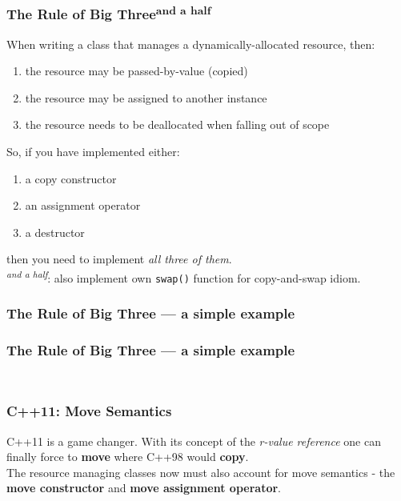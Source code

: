 \documentclass[aspectratio=169]{beamer}
\newcommand{\greenemph}[1]{\textit{\textcolor{clGreen}{#1}}}
\begin{document}
\begin{frame}
\frametitle{The Rule of Big Three\textsuperscript{and a half}}
When writing a class that manages a dynamically-allocated resource, then:
\begin{enumerate}
\item{the resource may be passed-by-value (copied)}
\item{the resource may be assigned to another instance}
\item{the resource needs to be deallocated when falling out of scope}
\end{enumerate}
\vspace{0.1cm}
So, if you have implemented either:
\begin{enumerate}
\item{a copy constructor}
\item{an assignment operator}
\item{a destructor}
\end{enumerate}
then you need to implement \greenemph{all three of them}.\\
\vspace{0.5cm}
\greenemph{\textsuperscript{and a half}}: also implement own \texttt{swap()} function for copy-and-swap idiom.
\end{frame}

\begin{frame}
\frametitle{The Rule of Big Three --- a simple example}
{\fontsize{8}{6} }

\end{frame}

\begin{frame}
\frametitle{The Rule of Big Three --- a simple example}
\begin{columns}
  \begin{column}{0.45\textwidth}
    {\fontsize{4}{4} }
  \end{column}
  \begin{column}{0.55\textwidth}
    {\fontsize{4}{4} }
  \end{column}
\end{columns}
\end{frame}

\begin{frame}
\frametitle{C++11: Move Semantics}
C++11 is a game changer. With its concept of the \textit{r-value reference} one can finally force to \textbf{move} where C++98 would \textbf{copy}.
\\
\vspace{1cm}
The resource managing classes now must also account for move semantics - the \textbf{move constructor} and \textbf{move assignment operator}.
\end{frame}
\end{document}
